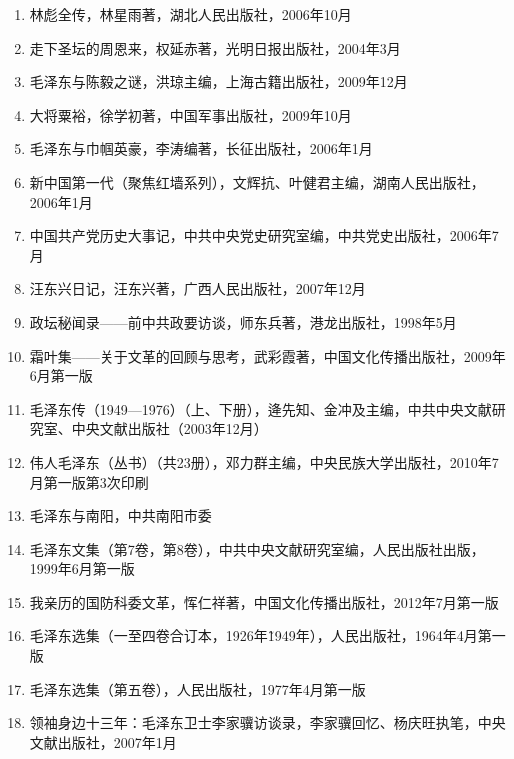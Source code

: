 \documentclass[../dazhuan.tex]{subfiles}
\begin{document}
\begin{enumerate}
\item 林彪全传，林星雨著，湖北人民出版社，2006年10月

\item 走下圣坛的周恩来，权延赤著，光明日报出版社，2004年3月

\item 毛泽东与陈毅之谜，洪琼主编，上海古籍出版社，2009年12月

\item 大将粟裕，徐学初著，中国军事出版社，2009年10月

\item 毛泽东与巾帼英豪，李涛编著，长征出版社，2006年1月

\item 新中国第一代（聚焦红墙系列），文辉抗、叶健君主编，湖南人民出版社，2006年1月

\item 中国共产党历史大事记，中共中央党史研究室编，中共党史出版社，2006年7月

\item 汪东兴日记，汪东兴著，广西人民出版社，2007年12月

\item 政坛秘闻录——前中共政要访谈，师东兵著，港龙出版社，1998年5月

\item 霜叶集——关于文革的回顾与思考，武彩霞著，中国文化传播出版社，2009年6月第一版

\item 毛泽东传（1949—1976）（上、下册），逄先知、金冲及主编，中共中央文献研究室、中央文献出版社（2003年12月）

\item 伟人毛泽东（丛书）（共23册），邓力群主编，中央民族大学出版社，2010年7月第一版第3次印刷

\item 毛泽东与南阳，中共南阳市委

\item 毛泽东文集（第7卷，第8卷），中共中央文献研究室编，人民出版社出版，1999年6月第一版

\item 我亲历的国防科委文革，恽仁祥著，中国文化传播出版社，2012年7月第一版

\item 毛泽东选集（一至四卷合订本，1926年\~1949年），人民出版社，1964年4月第一版

\item 毛泽东选集（第五卷），人民出版社，1977年4月第一版

\item 领袖身边十三年：毛泽东卫士李家骥访谈录，李家骥回忆、杨庆旺执笔，中央文献出版社，2007年1月


\end{enumerate}
\end{document}
